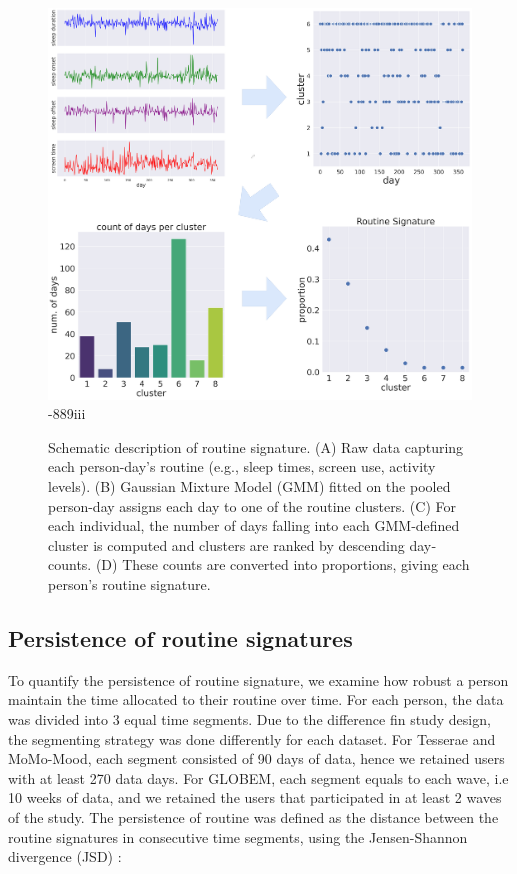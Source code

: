 \documentclass[pdflatex,sn-vancouver,Numbered]{bst/sn-jnl}%
\theoremstyle{thmstyleone}%
\theoremstyle{thmstyletwo}%
\theoremstyle{thmstylethree}%
\begin{document}
\begin{figure}[!htbp]
    \centering
    \includegraphics[width=\textwidth]{figures/test-schema.png}-889iii
    \caption{Schematic description of routine signature. (A) Raw data capturing each person-day’s routine (e.g., sleep times, screen use, activity levels).
(B) Gaussian Mixture Model (GMM) fitted on the pooled person-day assigns each day to one of the routine clusters.
(C) For each individual, the number of days falling into each GMM‐defined cluster is computed and clusters are ranked by descending day‐counts.
(D) These counts are converted into proportions, giving each person’s routine signature.}
    \label{fig:routine-sig-workflow}
\end{figure}

\subsection*{Persistence of routine signatures}\label{sec:methods:signature_persistence}  

To quantify the persistence of routine signature, we examine how robust a person maintain the time allocated to their routine over time. For each person, the data was divided into 3 equal time segments. Due to the difference fin study design, the segmenting strategy was done differently for each dataset. For Tesserae and MoMo-Mood, each segment consisted of 90 days of data, hence we retained users with at least 270 data days. For GLOBEM, each segment equals to each wave, i.e 10 weeks of data, and we retained the users that participated in at least 2 waves of the study. The persistence of routine was defined as the distance between the routine signatures in consecutive time segments, using the Jensen-Shannon divergence (JSD) \cite{lin1991divergence}:
\end{document}
